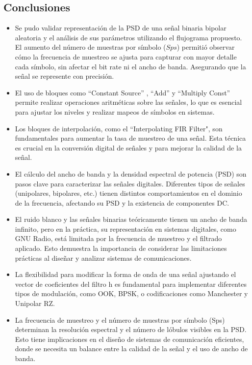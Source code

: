 \documentclass{journal}[IEEEtran, twocolumn]             %
\begin{document}
\begin{multicols}{2}
\section{Conclusiones}

\begin{itemize}
    
    \item Se pudo validar representación de la PSD de una señal binaria bipolar aleatoria y el análisis de sus parámetros utilizando el flujograma propuesto. El aumento del número de muestras por símbolo ($Sps$) permitió observar cómo la frecuencia de muestreo se ajusta para capturar con mayor detalle cada símbolo, sin afectar el bit rate ni el ancho de banda. Asegurando que la señal se represente con precisión.
    \item El uso de bloques como ``Constant Source'' , ``Add''  y ``Multiply Const''  permite realizar operaciones aritméticas sobre las señales, lo que es esencial para ajustar los niveles y realizar mapeos de símbolos en sistemas.
    \item Los bloques de interpolación, como el ``Interpolating FIR Filter", son fundamentales para aumentar la tasa de muestreo de una señal. Esta técnica es crucial en la conversión digital de señales y para mejorar la calidad de la señal.
    \item El cálculo del ancho de banda y la densidad espectral de potencia (PSD) son pasos clave para caracterizar las señales digitales. Diferentes tipos de señales (unipolares, bipolares, etc.) tienen distintos comportamientos en el dominio de la frecuencia, afectando su PSD y la existencia de componentes DC.
    \item El ruido blanco y las señales binarias teóricamente tienen un ancho de banda infinito, pero en la práctica, su representación en sistemas digitales, como GNU Radio, está limitada por la frecuencia de muestreo y el filtrado aplicado. Esto demuestra la importancia de considerar las limitaciones prácticas al diseñar y analizar sistemas de comunicaciones.
    \item La flexibilidad para modificar la forma de onda de una señal ajustando el vector de coeficientes del filtro h es fundamental para implementar diferentes tipos de modulación, como OOK, BPSK, o codificaciones como Manchester y Unipolar RZ.
    \item La frecuencia de muestreo y el número de muestras por símbolo (Sps) determinan la resolución espectral y el número de lóbulos visibles en la PSD. Esto tiene implicaciones en el diseño de sistemas de comunicación eficientes, donde se necesita un balance entre la calidad de la señal y el uso de ancho de banda.

\end{itemize}
\end{multicols}
\end{document}
